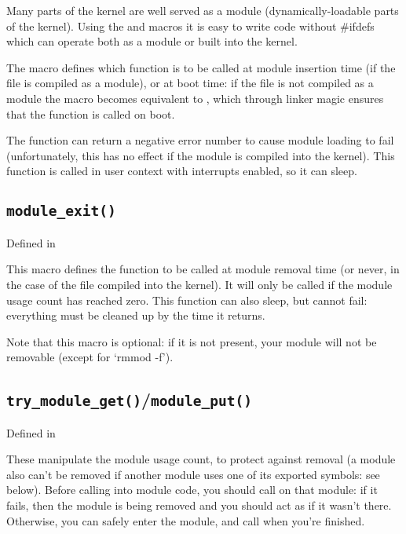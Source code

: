 \documentclass[a4paper,8pt,english]{sphinxmanual}
\begin{document}
Many parts of the kernel are well served as a module
(dynamically-loadable parts of the kernel). Using the
 and  macros it
is easy to write code without \#ifdefs which can operate both as a module
or built into the kernel.

The  macro defines which function is to be
called at module insertion time (if the file is compiled as a module),
or at boot time: if the file is not compiled as a module the
 macro becomes equivalent to
, which through linker magic ensures that
the function is called on boot.

The function can return a negative error number to cause module loading
to fail (unfortunately, this has no effect if the module is compiled
into the kernel). This function is called in user context with
interrupts enabled, so it can sleep.


\subsection{\texttt{module\_exit()}}
\label{kernel-hacking/hacking:module-exit}
Defined in  

This macro defines the function to be called at module removal time (or
never, in the case of the file compiled into the kernel). It will only
be called if the module usage count has reached zero. This function can
also sleep, but cannot fail: everything must be cleaned up by the time
it returns.

Note that this macro is optional: if it is not present, your module will
not be removable (except for `rmmod -f').


\subsection{\texttt{try\_module\_get()}/\texttt{module\_put()}}
\label{kernel-hacking/hacking:try-module-get-module-put}
Defined in 

These manipulate the module usage count, to protect against removal (a
module also can't be removed if another module uses one of its exported
symbols: see below). Before calling into module code, you should call
 on that module: if it fails, then the
module is being removed and you should act as if it wasn't there.
Otherwise, you can safely enter the module, and call
 when you're finished.
\end{document}
